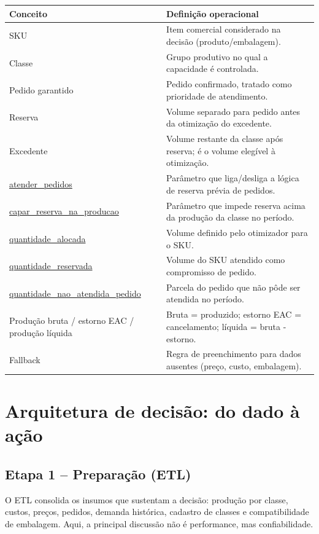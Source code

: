 \documentclass[11pt,a4paper]{article}
\begin{document}
\begin{longtable}{>{\raggedright\arraybackslash}p{5.8cm}>{\raggedright\arraybackslash}p{9.2cm}}
\toprule
\textbf{Conceito} & \textbf{Definição operacional} \\
\midrule
\endhead
SKU & Item comercial considerado na decisão (produto/embalagem). \\
Classe & Grupo produtivo no qual a capacidade é controlada. \\
Pedido garantido & Pedido confirmado, tratado como prioridade de atendimento. \\
Reserva & Volume separado para pedido antes da otimização do excedente. \\
Excedente & Volume restante da classe após reserva; é o volume elegível à otimização. \\
\url{atender_pedidos} & Parâmetro que liga/desliga a lógica de reserva prévia de pedidos. \\
\url{capar_reserva_na_producao} & Parâmetro que impede reserva acima da produção da classe no período. \\
\url{quantidade_alocada} & Volume definido pelo otimizador para o SKU. \\
\url{quantidade_reservada} & Volume do SKU atendido como compromisso de pedido. \\
\url{quantidade_nao_atendida_pedido} & Parcela do pedido que não pôde ser atendida no período. \\
Produção bruta / estorno EAC / produção líquida & Bruta = produzido; estorno EAC = cancelamento; líquida = bruta - estorno. \\
Fallback & Regra de preenchimento para dados ausentes (preço, custo, embalagem). \\
\bottomrule
\end{longtable}

\section{Arquitetura de decisão: do dado à ação}

\subsection{Etapa 1 -- Preparação (ETL)}

O ETL consolida os insumos que sustentam a decisão: produção por classe, custos,
preços, pedidos, demanda histórica, cadastro de classes e compatibilidade de
embalagem. Aqui, a principal discussão não é performance, mas confiabilidade.
\end{document}
